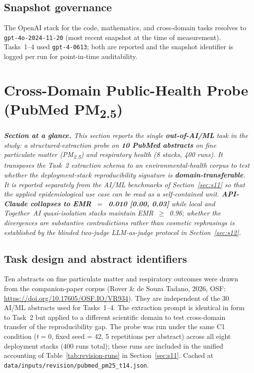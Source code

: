 \documentclass[11pt]{article}
\begin{document}
\subsection{Snapshot governance}

The OpenAI stack for the code, mathematics, and cross-domain tasks resolves to \texttt{gpt-4o-2024-11-20} (most recent snapshot at the time of measurement). Tasks~1--4 used \texttt{gpt-4-0613}; both are reported and the snapshot identifier is logged per run for point-in-time auditability.

\section{Cross-Domain Public-Health Probe (PubMed PM\textsubscript{2.5})}\label{sec:s11b}

\textit{\textbf{Section at a glance.} This section reports the single \textbf{out-of-AI/ML} task in the study: a structured-extraction probe on \textbf{10 PubMed abstracts} on fine particulate matter (PM\textsubscript{2.5}) and respiratory health (8 stacks, 400 runs). It transposes the Task~2 extraction schema to an environmental-health corpus to test whether the deployment-stack reproducibility signature is \textbf{domain-transferable}. It is reported separately from the AI/ML benchmarks of Section~\ref{sec:s11} so that the applied epidemiological use case can be read as a self-contained unit. \textbf{API-Claude collapses to EMR~$=$~0.010 [0.00, 0.03]} while local and Together~AI quasi-isolation stacks maintain EMR~$\geq$~0.96; whether the divergences are substantive contradictions rather than cosmetic rephrasings is established by the blinded two-judge LLM-as-judge protocol in Section~\ref{sec:s12}.}

\subsection{Task design and abstract identifiers}

Ten abstracts on fine particulate matter and respiratory outcomes were drawn from the companion-paper corpus (Rover \& de Souza Tadano, 2026, OSF: \url{https://doi.org/10.17605/OSF.IO/VR934}). They are independent of the 30 AI/ML abstracts used for Tasks~1--4. The extraction prompt is identical in form to Task~2 but applied to a different scientific domain to test cross-domain transfer of the reproducibility gap. The probe was run under the same C1 condition ($t{=}0$, fixed seed = 42, 5 repetitions per abstract) across all eight deployment stacks (400 runs total); these runs are included in the unified accounting of Table~\ref{tab:revision-runs} in Section~\ref{sec:s11}. Cached at \texttt{data/inputs/revision/pubmed\_pm25\_t14.json}.
\end{document}
